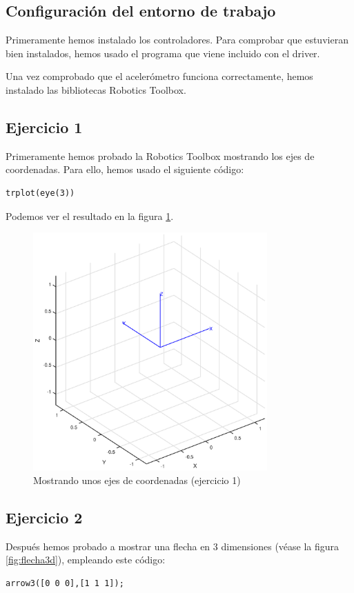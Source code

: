\documentclass{article}
\newcommand{\fref}[1]{figura \ref{fig:#1}}
\newcommand{\sej}[1]{\subsection{Ejercicio #1}}
\begin{document}
\subsection{Configuración del entorno de trabajo}
Primeramente hemos instalado los controladores. Para comprobar que
estuvieran bien instalados, hemos usado el programa que viene incluido
con el driver.

Una vez comprobado que el acelerómetro funciona correctamente, 
hemos instalado las bibliotecas Robotics Toolbox.

\sej{1}

Primeramente hemos probado la Robotics Toolbox mostrando los ejes
de coordenadas. Para ello, hemos usado el siguiente código:

\begin{lstlisting}[frame=single]
trplot(eye(3))
\end{lstlisting}

Podemos ver el resultado en la \fref{ejcoor}.
\begin{figure}[h]
\centering
\includegraphics[width=0.8\textwidth]{practica2_ex1.eps}
\caption{Mostrando unos ejes de coordenadas (ejercicio 1)}
\label{fig:ejcoor}
\end{figure}

\sej{2}
Después hemos probado a mostrar una flecha en 3 dimensiones (véase la \fref{flecha3d}),
empleando este código:

\begin{lstlisting}[frame=single]
arrow3([0 0 0],[1 1 1]);
\end{lstlisting}
\end{document}
